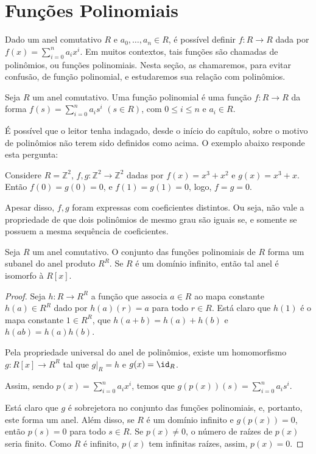 \section{Funções Polinomiais}
Dado um anel comutativo $R$ e $a_0, \dots, a_n\in R$, é possível definir $f:R\rightarrow R$ dada por $f(x)=\sum_{i=0}^n a_ix^i$.
Em muitos contextos, tais funções são chamadas de polinômios, ou funções polinomiais.
Nesta seção, as chamaremos, para evitar confusão, de função polinomial, e estudaremos sua relação com polinômios.

\begin{definition}
Seja $R$ um anel comutativo.
Uma função polinomial é uma função $f:R\rightarrow R$ da forma $f(s)=\sum_{i=0}^n a_is^i$ $(s \in R)$, com $0\leq i\leq n$ e $a_i\in R$.
\end{definition}

É possível que o leitor tenha indagado, desde o início do capítulo, sobre o motivo de polinômios não terem sido definidos como acima.
O exemplo abaixo responde esta pergunta:

\begin{exemplo}
Considere $R=\mathbb Z^2$, $f, g:\mathbb Z^2\rightarrow \mathbb Z^2$ dadas por $f(x)=x^3+x^2$ e $g(x)=x^3+x$. Então $f(0)=g(0)=0$, e $f(1)=g(1)=0$, logo, $f=g=0$.

Apesar disso, $f, g$ foram expressas com coeficientes distintos. Ou seja, não vale a propriedade de que dois polinômios de mesmo grau são iguais se, e somente se possuem a mesma sequência de coeficientes.
\end{exemplo}

\begin{prop}
Seja $R$ um anel comutativo. O conjunto das funções polinomiais de $R$ forma um subanel do anel produto $R^R$.
Se $R$ é um domínio infinito, então tal anel é isomorfo à $R[x]$.
\end{prop}

\begin{proof}
    Seja $h:R\rightarrow R^R$ a função que associa $a \in R$ ao mapa constante $h(a)\in R^R$ dado por $h(a)(r)=a$ para todo $r \in R$.
    Está claro que $h(1)$ é o mapa constante $1 \in R^R$, que $h(a+b)=h(a)+h(b)$ e $h(ab)=h(a)h(b)$.

    Pela propriedade universal do anel de polinômios, existe um homomorfismo $g:R[x]\rightarrow R^R$ tal que $g|_{R}=h$ e $g(x)=\id_R$.
    
    Assim, sendo $p(x)=\sum_{i=0}^n a_ix^i$, temos que $g(p(x))(s)=\sum_{i=0}^n a_is^i$.

    Está claro que $g$ é sobrejetora no conjunto das funções polinomiais, e, portanto, este forma um anel. Além disso, se $R$ é um domínio infinito e $g(p(x))=0$, então $p(s)=0$ para todo $s \in R$.
    Se $p(x)\neq 0$, o número de raízes de $p(x)$ seria finito. Como $R$ é infinito, $p(x)$ tem infinitas raízes, assim, $p(x)=0$.
\end{proof}
